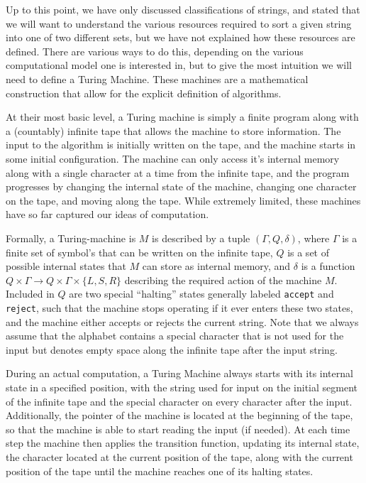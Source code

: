 \documentclass[../thesis-main/thesis-main]{subfiles}
\begin{document}
Up to this point, we have only discussed classifications of strings, and stated that we will want to understand the various resources required to sort a given string into one of two different sets, but we have not explained how these resources are defined.  There are various ways to do this, depending on the various computational model one is interested in, but to give the most intuition we will need to define a Turing Machine.  These machines are a mathematical construction that allow for the explicit definition of algorithms.  

At their most basic level, a Turing machine is simply a finite program along with a (countably) infinite tape that allows the machine to store information.  The input to the algorithm is initially written on the tape, and the machine starts in some initial configuration.  The machine can only access it's internal memory along with a single character at a time from the infinite tape, and the program progresses by changing the internal state of the machine, changing one character on the tape, and moving along the tape.  While extremely limited, these machines have so far captured our ideas of computation.

Formally, a Turing-machine is $M$ is described by a tuple $(\Gamma,Q,\delta)$, where $\Gamma$ is a finite set of symbol's that can be written on the infinite tape, $Q$ is a set of possible internal states that $M$ can store as internal memory, and $\delta$ is a function $Q\times \Gamma \rightarrow Q \times \Gamma\times \{L,S,R\}$ describing the required action of the machine $M$.  Included in $Q$ are two special ``halting'' states generally labeled \texttt{accept} and \texttt{reject}, such that the machine stops operating if it ever enters these two states, and the machine either accepts or rejects the current string.  Note that we always assume that the alphabet contains a special character \textvisiblespace that is not used for the input but denotes empty space along the infinite tape after the input string.

During an actual computation, a Turing Machine always starts with its internal state in a specified position, with the string used for input on the initial segment of the infinite tape and the special character \textvisiblespace on every character after the input.  Additionally, the pointer of the machine is located at the beginning of the tape, so that the machine is able to start reading the input (if needed).  At each time step the machine then applies the transition function, updating its internal state, the character located at the current position of the tape, along with the current position of the tape until the machine reaches one of its halting states.
\end{document}
